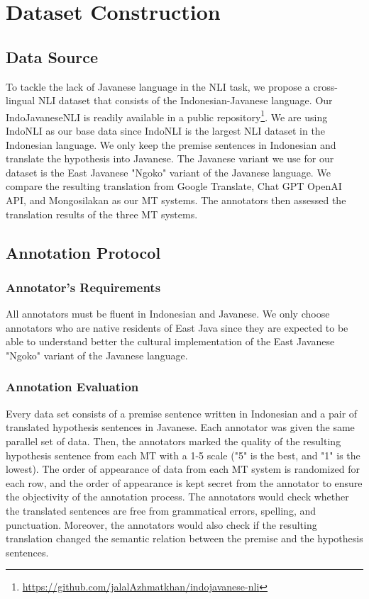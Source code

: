 \documentclass[a4paper, conference]{IEEEtran}
\begin{document}
\section{Dataset Construction}\label{datasetConstruction}
\subsection{Data Source}\label{dataSource}
To tackle the lack of Javanese language in the NLI task, we propose a cross-lingual NLI dataset that consists of the Indonesian-Javanese language. Our IndoJavaneseNLI is readily available in a public repository\footnote{\href{https://github.com/jalalAzhmatkhan/indojavanese-nli}{https://github.com/jalalAzhmatkhan/indojavanese-nli}}. We are using IndoNLI as our base data since IndoNLI is the largest NLI dataset in the Indonesian language. We only keep the premise sentences in Indonesian and translate the hypothesis into Javanese. The Javanese variant we use for our dataset is the East Javanese "Ngoko" variant of the Javanese language. We compare the resulting translation from Google Translate, Chat GPT OpenAI API, and Mongosilakan as our MT systems. The annotators then assessed the translation results of the three MT systems.

\subsection{Annotation Protocol}\label{annotationProtocol}
\subsubsection{Annotator's Requirements}\label{annotatorsRequirements}
All annotators must be fluent in Indonesian and Javanese. We only choose annotators who are native residents of East Java since they are expected to be able to understand better the cultural implementation of the East Javanese "Ngoko" variant of the Javanese language.

\subsubsection{Annotation Evaluation}\label{annotationEvaluation}
Every data set consists of a premise sentence written in Indonesian and a pair of translated hypothesis sentences in Javanese. Each annotator was given the same parallel set of data. Then, the annotators marked the quality of the resulting hypothesis sentence from each MT with a 1-5 scale ("5" is the best, and "1" is the lowest). The order of appearance of data from each MT system is randomized for each row, and the order of appearance is kept secret from the annotator to ensure the objectivity of the annotation process. The annotators would check whether the translated sentences are free from grammatical errors, spelling, and punctuation. Moreover, the annotators would also check if the resulting translation changed the semantic relation between the premise and the hypothesis sentences.
\end{document}

